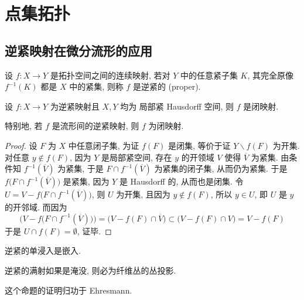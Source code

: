 \chapter{点集拓扑}
    \section{逆紧映射在微分流形的应用}
        \begin{definition}[逆紧映射的定义]
            设 $f:X\rightarrow Y$ 是拓扑空间之间的连续映射, 若对 $Y$ 中的任意紧子集 $K$, 
            其完全原像 $f^{-1}(K)$ 都是 $X$ 中的紧集, 则称 $f$ 是逆紧的 {\rm (proper)}.
        \end{definition}
        \begin{proposition}[流形间的逆紧映射是闭映射]
            设 $f:X\rightarrow Y$ 为逆紧映射且 $X,Y$ 均为 局部紧 {\rm Hausdorff} 空间, 
            则 $f$ 是闭映射.

            特别地, 若 $f$ 是流形间的逆紧映射, 则 $f$ 为闭映射.
        \end{proposition}
        \begin{proof}
            设 $F$ 为 $X$ 中任意闭子集, 为证 $f(F)$ 是闭集, 等价于证 $Y\backslash f(F)$ 为开集.
            对任意 $y\notin f(F)$, 因为 $Y$ 是局部紧空间, 存在 $y$ 的开领域 $V$ 使得 $\overline{V}$ 为紧集.
            由条件知 $f^{-1}(\overline{V})$ 为紧集, 于是 $F\cap f^{-1}(\overline{V})$ 为紧集的闭子集, 从而仍为紧集.
            于是 $f\big(F\cap f^{-1}(\overline{V})\big)$ 是紧集, 因为 $Y$ 是 {\rm Hausdorff} 的, 从而也是闭集.
            令 $U = V - f\big(F\cap f^{-1}(\overline{V})\big)$, 则 $U$ 为开集, 且因为 $y\notin f(F)$, 所以 $y\in U$, 
            即 $U$ 是 $y$ 的开邻域. 而因为 
            \begin{equation*}
                \Big(V - f\big(F\cap f^{-1}(\overline{V})\big)\Big) = \Big(V - f(F)\cap\overline{V}\Big) \subset\Big(V - f(F)\cap V\Big) = V - f(F)
            \end{equation*}
            于是 $U\cap f(F) = \emptyset$, 证毕.
        \end{proof}

        \begin{proposition}
            逆紧的单浸入是嵌入.
        \end{proposition}

        \begin{proposition}
            逆紧的满射如果是淹没, 则必为纤维丛的丛投影. 

            这个命题的证明归功于 {\rm Ehresmann}.
        \end{proposition}
